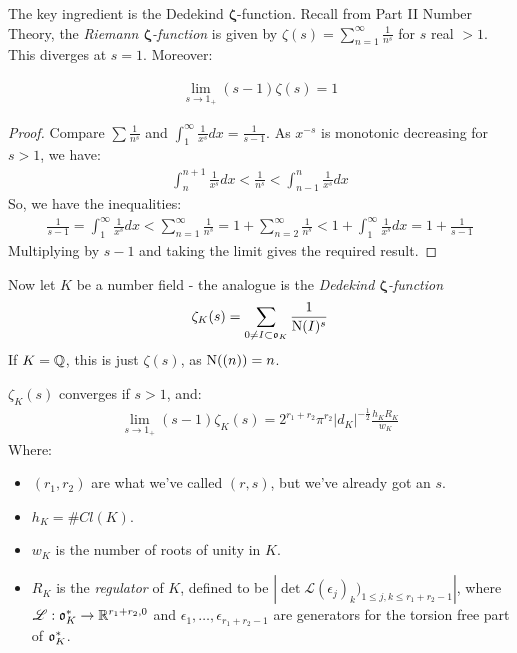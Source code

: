 \documentclass[10pt,a4paper]{article}
\begin{document}
The key ingredient is the Dedekind $\bm{\zeta}$-function. Recall from Part II Number Theory, the \emph{Riemann $\bm{\zeta}$-function} is given by $\zeta(s) = \sum_{n=1}^\infty \frac{1}{n^s}$ for $s$ real $>1$. This diverges at $s = 1$. Moreover:
\begin{proposition}
\begin{align*}
\lim_{s\to 1_+} (s-1)\zeta(s) = 1
\end{align*}
\end{proposition}
\begin{proof}
Compare $\sum\frac{1}{n^s}$ and $\int_{1}^\infty \frac{1}{x^s}dx = \frac{1}{s-1}$. As $x^{-s}$ is monotonic decreasing for $s>1$, we have:
\begin{align*}
\int_{n}^{n+1}\frac{1}{x^s}dx < \frac{1}{n^s} < \int_{n-1}^n \frac{1}{x^s}dx
\end{align*}
So, we have the inequalities:
\begin{align*}
\frac{1}{s-1} = \int_{1}^\infty \frac{1}{x^s} dx < \sum_{n =1}^{\infty}\frac{1}{n^s} = 1+ \sum_{n=2}^\infty \frac{1}{n^s} < 1+ \int_{1}^\infty \frac{1}{x^s}dx = 1+\frac{1}{s-1}
\end{align*}
Multiplying by $s-1$ and taking the limit gives the required result.
\end{proof}
Now let $K$ be a number field - the analogue is the \emph{Dedekind $\bm{\zeta}$-function}
\begin{align*}
\zeta_K(s) = \sum_{0 \neq I \subset \mathfrak{o}_K} \frac{1}{\operatorname{N}(I)^s}
\end{align*}
If $K = \mathbb{Q}$, this is just $\zeta(s)$, as $\operatorname{N}((n)) = n$.
\begin{theorem}
$\zeta_K(s)$ converges if $s>1$, and:
\begin{align*}
\lim_{s\to 1_+} (s-1)\zeta_K(s) = 2^{r_1+r_2} \pi^{r_2}|d_K|^{-\frac12}\frac{h_K R_K}{w_K}
\end{align*}
Where:
\begin{itemize}
\item $(r_1,r_2)$ are what we've called $(r,s)$, but we've already got an $s$.
\item $h_K = \#Cl(K)$.
\item $w_K$ is the number of roots of unity in $K$.
\item $R_K$ is the \emph{regulator} of $K$, defined to be $|\det \mathscr{L}(\epsilon_j)_k)_{1\leq j,k\leq r_1+r_2-1}|$, where $\mathscr{L}:\mathfrak{o}_K^\ast \to \mathbb{R}^{r_1+r_2,0}$ and $\epsilon_1, \ldots, \epsilon_{r_1+r_2-1}$ are generators for the torsion free part of $\mathfrak{o}_K^\ast$.
\end{itemize}
\end{theorem}
\end{document}
